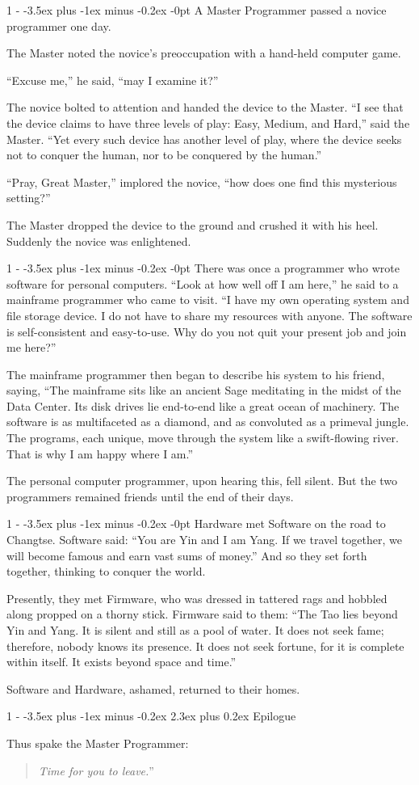 \documentclass[12pt,letterpaper,titlepage]{article}
\makeatletter
\newlength{\intomargin}\setlength{\intomargin}{25pt}
\renewcommand{\section}{%
\@startsection{section}%
{1}%
{-\intomargin}%
{-3.5ex plus -1ex minus -0.2ex}%
{2.3ex plus 0.2ex}%
{\clearpage\normalfont\Large\bfseries}%
}
\renewcommand{\subsection}{%
\@startsection{subsection}%
{1}%
{-\intomargin}%
{-3.5ex plus -1ex minus -0.2ex}%
{-0pt}%
{\normalfont\normalsize\bfseries}%
}
\newcommand{\book}[2]{\section{#1}\par\hspace{-\intomargin}Thus spake the Master Programmer:%
\begin{quotation}\noindent\llap{``}\textsl{#2}''\end{quotation}\medskip}
\newcommand{\sect}{\subsection{}}
\makeatother
\begin{document}
\sect
A Master Programmer passed a novice programmer one day.

The Master noted the novice's preoccupation with a hand-held computer
game.

``Excuse me,'' he said, ``may I examine it?''

The novice bolted to attention and handed the device to the
Master. ``I see that the device claims to have three levels of play:
Easy, Medium, and Hard,'' said the Master. ``Yet every such device has
another level of play, where the device seeks not to conquer the
human, nor to be conquered by the human.''

``Pray, Great Master,'' implored the novice, ``how does one find this
mysterious setting?''

The Master dropped the device to the ground and crushed it with his
heel. Suddenly the novice was enlightened.

\sect
There was once a programmer who wrote software for personal
computers. ``Look at how well off I am here,'' he said to a mainframe
programmer who came to visit. ``I have my own operating system and
file storage device. I do not have to share my resources with
anyone. The software is self-consistent and easy-to-use. Why do you
not quit your present job and join me here?''

The mainframe programmer then began to describe his system to his
friend, saying, ``The mainframe sits like an ancient Sage meditating
in the midst of the Data Center. Its disk drives lie end-to-end like a
great ocean of machinery. The software is as multifaceted as a
diamond, and as convoluted as a primeval jungle. The programs, each
unique, move through the system like a swift-flowing river. That is
why I am happy where I am.''

The personal computer programmer, upon hearing this, fell silent. But
the two programmers remained friends until the end of their days.

\sect
Hardware met Software on the road to Changtse. Software said: ``You
are Yin and I am Yang. If we travel together, we will become famous
and earn vast sums of money.'' And so they set forth together,
thinking to conquer the world.

Presently, they met Firmware, who was dressed in tattered rags and
hobbled along propped on a thorny stick. Firmware said to them: ``The
Tao lies beyond Yin and Yang. It is silent and still as a pool of
water. It does not seek fame; therefore, nobody knows its presence. It
does not seek fortune, for it is complete within itself. It exists
beyond space and time.''

Software and Hardware, ashamed, returned to their homes.

\book{Epilogue}%
{Time for you to leave.}
\end{document}
